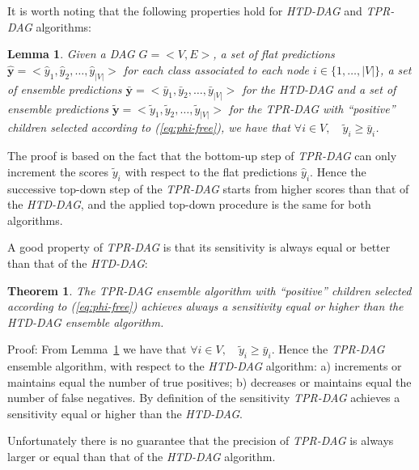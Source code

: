 \documentclass{bioinfo}
\newcommand{\by}{\boldsymbol{y}}
\newtheorem{theorem}{Theorem}
\newtheorem{lemma}{Lemma}
\begin{document}
It is worth noting that the following properties hold for {\em HTD-DAG} and {\em TPR-DAG} algorithms:
\begin{lemma} Given a DAG $G = <V,E>$, a set of flat predictions $\hat{\by} = < \hat{y}_1, \hat{y}_2, \ldots, \hat{y}_{|V|}>$ for each class associated to each node $i \in \{1, \ldots, |V| \}$, a set of ensemble predictions $\bar{\by} = < \bar{y}_1, \bar{y}_2, \ldots, \bar{y}_{|V|}>$ for the {\em HTD-DAG} and a set of ensemble predictions $\tilde{\by} = < \tilde{y}_1, \tilde{y}_2, \ldots, \tilde{y}_{|V|}>$ for the {\em TPR-DAG} with ``positive'' children selected according to (\ref{eq:phi-free}), we have that $\forall i \in V, \quad \tilde{y}_i \geq \bar{y}_i$.
\label{theo:TPRgeqHTD}
\end{lemma}
The proof is based on the fact that the bottom-up step of {\em TPR-DAG} can only increment the scores $\tilde{y}_i$ with respect to the flat predictions $\hat{y}_i$. Hence the successive top-down step of the {\em TPR-DAG} starts from higher scores than that of the {\em HTD-DAG}, and the applied top-down procedure is the same for both algorithms.

A good property of {\em TPR-DAG} is that its sensitivity is always equal or better than that of the {\em HTD-DAG}:
\begin{theorem}
The {\em TPR-DAG} ensemble algorithm with ``positive'' children selected according to (\ref{eq:phi-free}) achieves always a sensitivity equal or higher than the {\em HTD-DAG} ensemble algorithm.
\end{theorem}
Proof: From Lemma~\ref{theo:TPRgeqHTD} we have that $\forall i \in V, \quad \tilde{y}_i \geq \bar{y}_i$. Hence the {\em TPR-DAG} ensemble algorithm, with respect to the {\em HTD-DAG} algorithm:
a) increments or maintains equal the number of true positives; b) decreases or maintains equal the number of false negatives. By definition of the sensitivity {\em TPR-DAG} achieves a sensitivity equal or higher than the {\em HTD-DAG}.

Unfortunately there is no guarantee that the precision of {\em TPR-DAG} is always larger or equal than that of the {\em HTD-DAG} algorithm.


%
%
%
%
%
%
%

\end{document}
